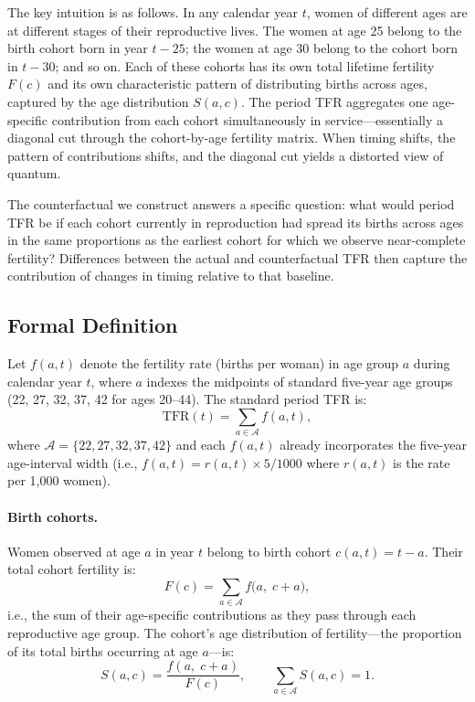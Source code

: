 \documentclass[12pt]{article}
\begin{document}
The key intuition is as follows.  In any calendar year $t$, women of
different ages are at different stages of their reproductive lives.
The women at age 25 belong to the birth cohort born in year $t-25$;
the women at age 30 belong to the cohort born in $t-30$; and so on.
Each of these cohorts has its own total lifetime fertility $F(c)$ and
its own characteristic pattern of distributing births across ages,
captured by the age distribution $S(a,c)$.  The period TFR aggregates
one age-specific contribution from each cohort simultaneously in
service---essentially a diagonal cut through the cohort-by-age
fertility matrix.  When timing shifts, the pattern of contributions
shifts, and the diagonal cut yields a distorted view of quantum.

The counterfactual we construct answers a specific question: what
would period TFR be if each cohort currently in reproduction had
spread its births across ages in the same proportions as the earliest
cohort for which we observe near-complete fertility?  Differences
between the actual and counterfactual TFR then capture the contribution
of changes in timing relative to that baseline.

\subsection{Formal Definition}

Let $f(a, t)$ denote the fertility rate (births per woman) in age
group $a$ during calendar year $t$, where $a$ indexes the midpoints
of standard five-year age groups (22, 27, 32, 37, 42 for ages 20--44).
The standard period TFR is:
\begin{equation}
    \mathrm{TFR}(t) = \sum_{a \in \mathcal{A}} f(a,t),
    \label{eq:TFR_def}
\end{equation}
where $\mathcal{A} = \{22, 27, 32, 37, 42\}$ and each $f(a,t)$ already
incorporates the five-year age-interval width (i.e., $f(a,t) =
r(a,t) \times 5/1000$ where $r(a,t)$ is the rate per 1{,}000 women).

\paragraph{Birth cohorts.}
Women observed at age $a$ in year $t$ belong to birth cohort
$c(a,t) = t - a$.  Their total cohort fertility is:
\begin{equation}
    F(c) = \sum_{a \in \mathcal{A}} f\!\bigl(a,\; c + a\bigr),
    \label{eq:cohort_quantum}
\end{equation}
i.e., the sum of their age-specific contributions as they pass through
each reproductive age group.  The cohort's age distribution of
fertility---the proportion of its total births occurring at age $a$---is:
\begin{equation}
    S(a, c) = \frac{f(a,\; c+a)}{F(c)}, \qquad
    \sum_{a \in \mathcal{A}} S(a,c) = 1.
    \label{eq:age_dist}
\end{equation}
\end{document}
